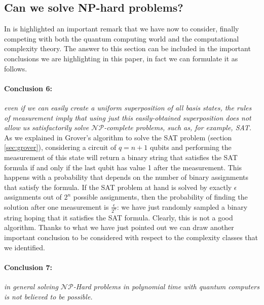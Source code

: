 \documentclass[english]{article}
\begin{document}
		\subsection{Can we solve NP-hard problems?}
		\label{sec:npHardProblems}
			In \cite[G.Nannicini, 2020]{introNoPh} is highlighted an important remark that we have now to consider, finally competing with both the quantum computing world and the computational complexity theory. The answer to this section can be included in the important conclusions we are highlighting in this paper, in fact we can formulate it as follows.
			
			\paragraph{Conclusion 6:} \emph{even if we can easily create a uniform superposition of all basis states, the rules of measurement imply that using just this easily-obtained superposition does not allow us satisfactorily solve $\mathcal{N}\mathcal{P}$-complete problems, such as, for example, SAT.} \\
			
			As we explained in Grover's algorithm to solve the SAT problem (section \ref{sec:grover}), considering a circuit of $q = n + 1$ qubits and performing the measurement of this state will return a binary string that satisfies the SAT formula if and only if the last qubit has value 1 after the measurement. This happens with a probability that depends on the number of binary assignments that satisfy the formula. If the SAT problem at hand is solved by exactly $\epsilon$ assignments out of $2^n$ possible assignments, then the probability of finding the solution after one measurement is $\frac{\epsilon}{2^n}$: we have just randomly sampled a binary string hoping that it satisfies the SAT formula. Clearly, this is not a good algorithm. Thanks to what we have just pointed out we can draw another important conclusion to be considered with respect to the complexity classes that we identified.
			
			\paragraph{Conclusion 7:} \emph{in general solving $\mathcal{N}\mathcal{P}$-Hard problems in polynomial time with quantum computers is not believed to be possible.} \\
			
\end{document}
